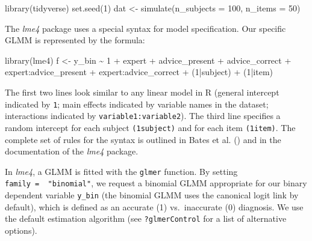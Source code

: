 \documentclass[
  man,
  floatsintext,
  longtable,
  a4paper,
  nolmodern,
  notxfonts,
  notimes,
  colorlinks=true,linkcolor=blue,citecolor=blue,urlcolor=blue]{apa7}
\newenvironment{Shaded}{\begin{snugshade}}{\end{snugshade}}
\newcommand{\AttributeTok}[1]{\textcolor[rgb]{0.40,0.45,0.13}{#1}}
\newcommand{\DecValTok}[1]{\textcolor[rgb]{0.68,0.00,0.00}{#1}}
\newcommand{\FunctionTok}[1]{\textcolor[rgb]{0.28,0.35,0.67}{#1}}
\newcommand{\NormalTok}[1]{\textcolor[rgb]{0.00,0.23,0.31}{#1}}
\newcommand{\OtherTok}[1]{\textcolor[rgb]{0.00,0.23,0.31}{#1}}
\newcommand{\SpecialCharTok}[1]{\textcolor[rgb]{0.37,0.37,0.37}{#1}}
\begin{document}
\begin{Shaded}
\begin{Highlighting}[]
\FunctionTok{library}\NormalTok{(tidyverse)}
\FunctionTok{set.seed}\NormalTok{(}\DecValTok{1}\NormalTok{)}
\NormalTok{dat }\OtherTok{\textless{}{-}} \FunctionTok{simulate}\NormalTok{(}\AttributeTok{n\_subjects =} \DecValTok{100}\NormalTok{, }\AttributeTok{n\_items =} \DecValTok{50}\NormalTok{)}
\end{Highlighting}
\end{Shaded}

The \emph{lme4} package uses a special syntax for model specification.
Our specific GLMM is represented by the formula:

\begin{Shaded}
\begin{Highlighting}[]
\FunctionTok{library}\NormalTok{(lme4)}
\NormalTok{f }\OtherTok{\textless{}{-}}\NormalTok{ y\_bin }\SpecialCharTok{\textasciitilde{}} \DecValTok{1} \SpecialCharTok{+}\NormalTok{ expert }\SpecialCharTok{+}\NormalTok{ advice\_present }\SpecialCharTok{+}\NormalTok{ advice\_correct }\SpecialCharTok{+} 
\NormalTok{  expert}\SpecialCharTok{:}\NormalTok{advice\_present }\SpecialCharTok{+}\NormalTok{ expert}\SpecialCharTok{:}\NormalTok{advice\_correct }\SpecialCharTok{+}
\NormalTok{  (}\DecValTok{1}\SpecialCharTok{|}\NormalTok{subject) }\SpecialCharTok{+}\NormalTok{ (}\DecValTok{1}\SpecialCharTok{|}\NormalTok{item)}
\end{Highlighting}
\end{Shaded}

The first two lines look similar to any linear model in R (general
intercept indicated by \texttt{1}; main effects indicated by variable
names in the dataset; interactions indicated by
\texttt{variable1:variable2}). The third line specifies a random
intercept for each subject \texttt{(1\textbar{}subject)} and for each
item \texttt{(1\textbar{}item)}. The complete set of rules for the
syntax is outlined in Bates et al.
() and in the
documentation of the \emph{lme4} package.

In \emph{lme4}, a GLMM is fitted with the \texttt{glmer} function. By
setting \texttt{family\ =\ \ "binomial"}, we request a binomial GLMM
appropriate for our binary dependent variable \texttt{y\_bin} (the
binomial GLMM uses the canonical logit link by default), which is
defined as an accurate (1) vs.~inaccurate (0) diagnosis. We use the
default estimation algorithm (see \texttt{?glmerControl} for a list of
alternative options).
\end{document}
